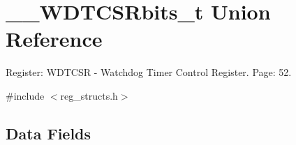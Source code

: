 \hypertarget{union_____w_d_t_c_s_rbits__t}{\section{\+\_\+\+\_\+\+W\+D\+T\+C\+S\+Rbits\+\_\+t Union Reference}
\label{union_____w_d_t_c_s_rbits__t}
}


Register\+: W\+D\+T\+C\+S\+R -\/ Watchdog Timer Control Register. Page\+: 52.  




{\ttfamily \#include $<$reg\+\_\+structs.\+h$>$}

\subsection*{Data Fields}
